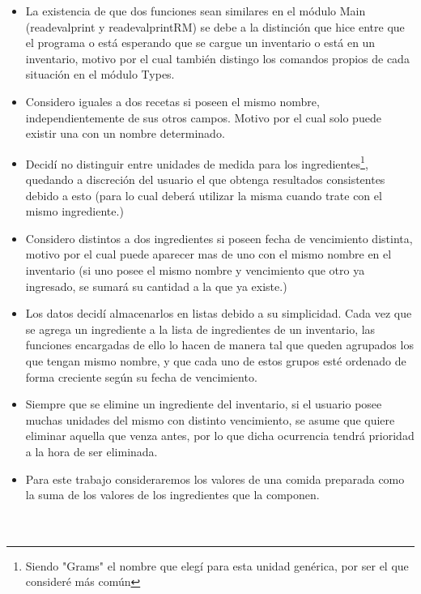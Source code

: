 \documentclass[a4paper]{article}
\begin{document}
\begin{itemize}
\item{} La existencia de que dos funciones sean similares en el módulo Main (readevalprint y readevalprintRM) se debe a la distinción que hice entre que el programa o está esperando que se cargue un inventario o está en un inventario, motivo por el cual también distingo los comandos propios de cada situación en el módulo Types.\\
\item{} Considero iguales a dos recetas si poseen el mismo nombre, independientemente de sus otros campos. Motivo por el cual solo puede existir una con un nombre determinado.\\
\item{} Decidí no distinguir entre unidades de medida para los ingredientes\footnote{Siendo "Grams" el nombre que elegí para esta unidad genérica, por ser el que consideré más común}, quedando a discreción del usuario el que obtenga resultados consistentes debido a esto (para lo cual deberá utilizar la misma cuando trate con el mismo ingrediente.)\\
\item{} Considero distintos a dos ingredientes si poseen fecha de vencimiento distinta, motivo por el cual puede aparecer mas de uno con el mismo nombre en el inventario (si uno posee el mismo nombre y vencimiento que otro ya ingresado, se sumará su cantidad a la que ya existe.)\\
\item{} Los datos decidí almacenarlos en listas debido a su simplicidad. Cada vez que se agrega un ingrediente a la lista de ingredientes de un inventario, las funciones encargadas de ello lo hacen de manera tal que queden agrupados los que tengan mismo nombre, y que cada uno de estos grupos esté ordenado de forma creciente según su fecha de vencimiento.\\
\item{} Siempre que se elimine un ingrediente del inventario, si el usuario posee muchas unidades del mismo con distinto vencimiento, se asume que quiere eliminar aquella que venza antes, por lo que dicha ocurrencia tendrá prioridad a la hora de ser eliminada. \\
\item{} Para este trabajo consideraremos los valores de una comida preparada como la suma de los valores de los ingredientes que la componen. \\\\\\
\end{itemize}
\end{document}
